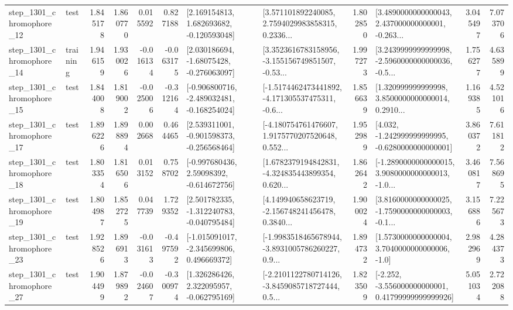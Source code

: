\begin{tabular}{llrrrrllrlrr}
 step\_1301\_chromophore\_12 &      test &      1.845178 &    1.860770 &      0.015592 &  0.827188 &    [2.169154813, 1.682693682, -0.120593048] &  [3.571101892240085, 2.7594029983858315, 0.2336... &       1.802850 &  [3.4890000000000043, 2.437000000000001, -0.263... &            3.045497 &          7.073706 \\
 step\_1301\_chromophore\_14 &  training &      1.946159 &    1.930026 &     -0.016134 & -0.063175 &    [2.030186694, -1.68075428, -0.276063097] &  [3.3523616783158956, -3.155156749851507, -0.53... &       1.997273 &  [3.2439999999999998, -2.5960000000000036, -0.5... &            1.756277 &          4.635899 \\
 step\_1301\_chromophore\_15 &      test &      1.844008 &    1.819002 &     -0.025006 & -0.312164 &  [-0.906800716, -2.489032481, -0.168254024] &  [-1.5174462473441892, -4.171305537475311, -0.6... &       1.856639 &  [1.320999999999998, 3.8500000000000014, 0.2910... &            1.169385 &          4.521016 \\
 step\_1301\_chromophore\_17 &      test &      1.896226 &    1.898894 &      0.002668 &  0.464465 &   [2.539311001, -0.901598373, -0.256568464] &  [-4.180754761476607, 1.9175770207520648, 0.552... &       1.952989 &   [4.032, -1.242999999999995, -0.6280000000000001] &            3.860372 &          7.611812 \\
 step\_1301\_chromophore\_18 &      test &      1.803354 &    1.816506 &      0.013152 &  0.758702 &    [-0.997680436, 2.59098392, -0.614672756] &  [1.6782379194842831, -4.324835443899354, 0.620... &       1.862642 &  [-1.2890000000000015, 3.9080000000000013, -1.0... &            3.460817 &          7.568695 \\
 step\_1301\_chromophore\_19 &      test &      1.804987 &    1.852725 &      0.047739 &  1.729352 &   [2.501782335, -1.312240783, -0.040795484] &  [4.149940658623719, -2.156748241456478, 0.3840... &       1.900024 &  [3.8160000000000025, -1.7590000000000003, -0.1... &            3.156886 &          7.225673 \\
 step\_1301\_chromophore\_23 &      test &      1.928526 &    1.896913 &     -0.031613 & -0.497592 &   [-1.015091017, -2.345699806, 0.496669372] &  [-1.9983518465678944, -3.8931005786260227, 0.9... &       1.894732 &     [1.5730000000000004, 3.7040000000000006, -1.0] &            2.982969 &          4.284373 \\
 step\_1301\_chromophore\_27 &      test &      1.904499 &    1.879892 &     -0.024607 & -0.300974 &    [1.326286426, 2.322095957, -0.062795169] &  [-2.2101122780714126, -3.8459085718727444, 0.5... &       1.823509 &  [-2.252, -3.556000000000001, 0.41799999999999926] &            5.051034 &          2.722088 \\

\end{tabular}
